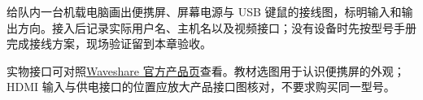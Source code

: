 \begin{exercise}\label{ex:deploy-physical}
给队内一台机载电脑画出便携屏、屏幕电源与 USB 键鼠的接线图，标明输入和输出方向。接入后记录实际用户名、主机名以及视频接口；没有设备时先按型号手册完成接线方案，现场验证留到本章验收。
\end{exercise}

实物接口可对照\href{https://www.waveshare.com/13.3inch-FHD-Monitor.htm}{Waveshare 官方产品页}查看。教材选图用于认识便携屏的外观；HDMI 输入与供电接口的位置应放大产品接口图核对，不要求购买同一型号。
